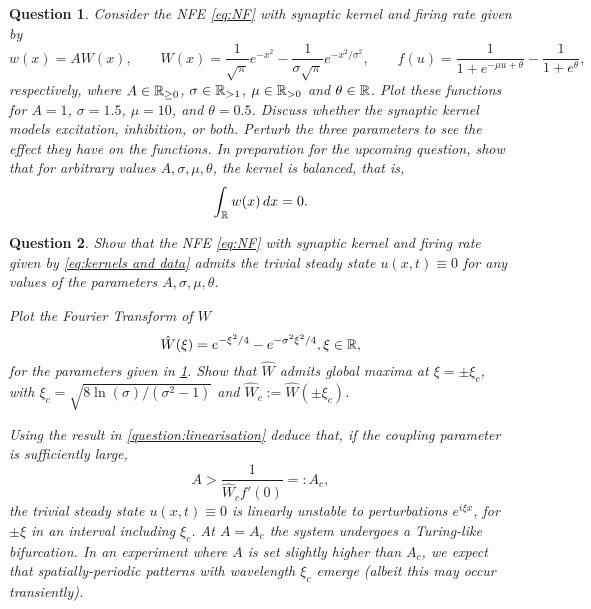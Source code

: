 \documentclass[a4paper]{siamonline220329}
\theoremstyle{plain}
\newtheorem{question}{Question}
\begin{document}
\begin{question}\label{question:kernels}
  Consider the NFE \cref{eq:NF} with synaptic kernel and firing rate given by
  \begin{equation}\label{eq:kernels and data}
    w(x) = A W(x), \qquad 
    W(x) = \frac{1}{\sqrt{\pi}}e^{-x^2} - \frac{1}{\sigma\sqrt{\pi}}e^{-x^2/\sigma^2},
    \qquad 
     f(u) = \frac{1}{1+e^{-\mu u+\theta}} - \frac{1}{1+e^{\theta}},
  \end{equation}
  respectively, where $A \in \mathbb{R}_{ \geq 0}$, $\sigma \in \mathbb{R}_{>1}$, $\mu \in \mathbb{R}_{>0}$ and
  $\theta \in \mathbb{R}$. Plot these functions for $A = 1$, $\sigma = 1.5$, $\mu = 10$,
  and $\theta = 0.5$. Discuss whether the synaptic
  kernel models excitation, inhibition, or both. Perturb the three parameters to see
  the effect they have on the functions. In preparation for the upcoming question,
  show that for arbitrary values $A, \sigma, \mu, \theta$, the kernel is
  \textit{balanced}, that is,
  \[
   \int_{\mathbb{R}} w(x) \,d x  = 0.
  \]
\end{question}


\begin{question} 
  Show that the NFE \cref{eq:NF} with synaptic kernel and firing rate given by
  \cref{eq:kernels and data} admits the trivial steady state $u(x,t) \equiv 0$ for any values
  of the parameters $A, \sigma, \mu, \theta$. 

  Plot the Fourier Transform of $W$
  \[
    \hat W(\xi) = e^{-\xi^2/4} -  e^{-\sigma^2\xi^2/4}, \xi \in \mathbb{R},
  \]
  for the parameters given in \cref{question:kernels}. Show that $\hat W$ admits
  global maxima at $\xi = \pm \xi_c$, with $\xi_c = \sqrt{8
  \ln(\sigma)/(\sigma^2-1)}$ and $\hat W_c := \hat W(\pm \xi_c)$.

  Using the result in \cref{question:linearisation} deduce that, if
  the coupling parameter is sufficiently large,
  \begin{equation}\label{eq:ACrit}
    A > \frac{1}{\hat W_c f'(0)}=:A_c,
  \end{equation}
  the trivial steady state $u(x,t) \equiv 0$ is linearly unstable to perturbations $e^{i\xi x}$,
  for $\pm \xi$ in an interval including $\xi_c$. At $A=A_c$ the system undergoes a
  Turing-like bifurcation. In an experiment where $A$ is set slightly higher than
  $A_c$, we expect that spatially-periodic patterns with wavelength $\xi_c$ emerge
  (albeit this may occur transiently).
\end{question} 
\end{document}
